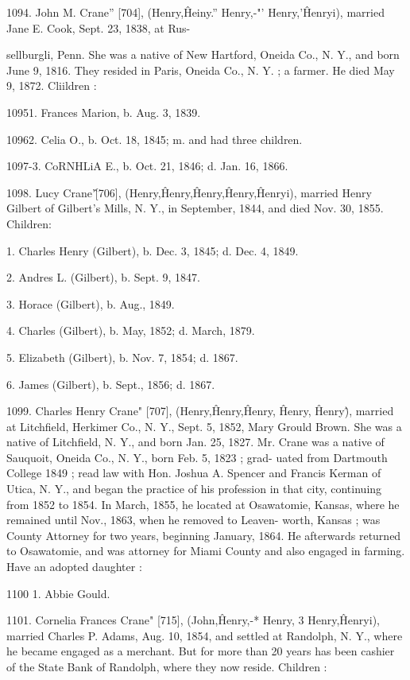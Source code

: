 1094. John M. Crane'' [704], (Henry,\^ Heiny.'' Henry,-"' 
Henry,'\^ Henryi), married Jane E. Cook, Sept. 23, 1838, at Rus- 




sellburgli, Penn. She was a native of New Hartford, Oneida 
Co., N. Y., and born June 9, 1816. They resided in Paris, 
Oneida Co., N. Y. ; a farmer. He died May 9, 1872. Cliildren : 

10951. Frances Marion, b. Aug. 3, 1839. 

10962. Celia O., b. Oct. 18, 1845; m. and had three children. 

1097-3. CoRNHLiA E., b. Oct. 21, 1846; d. Jan. 16, 1866. 

1098. Lucy Crane'\^ [706], (Henry,\^ Henry,\^ Henry,\^ Henry,\^ 
Henryi), married Henry Gilbert of Gilbert's Mills, N. Y., in 
September, 1844, and died Nov. 30, 1855. Children: 

1. Charles Henry (Gilbert), b. Dec. 3, 1845; d. Dec. 4, 1849. 

2. Andres L. (Gilbert), b. Sept. 9, 1847. 

3. Horace (Gilbert), b. Aug., 1849. 

4. Charles (Gilbert), b. May, 1852; d. March, 1879. 

5. Elizabeth (Gilbert), b. Nov. 7, 1854; d. 1867. 

6. James (Gilbert), b. Sept., 1856; d. 1867. 

1099. Charles Henry Crane" [707], (Henry,\^ Henry,\^ 
Henry, \^ Henry, \^ Henry\^), married at Litchfield, Herkimer Co., 
N. Y., Sept. 5, 1852, Mary Grould Brown. She was a native of 
Litchfield, N. Y., and born Jan. 25, 1827. Mr. Crane was a 
native of Sauquoit, Oneida Co., N. Y., born Feb. 5, 1823 ; grad- 
uated from Dartmouth College 1849 ; read law with Hon. Joshua 
A. Spencer and Francis Kerman of Utica, N. Y., and began the 
practice of his profession in that city, continuing from 1852 to 
1854. In March, 1855, he located at Osawatomie, Kansas, 
where he remained until Nov., 1863, when he removed to Leaven- 
worth, Kansas ; was County Attorney for two years, beginning 
January, 1864. He afterwards returned to Osawatomie, and was 
attorney for Miami County and also engaged in farming. Have 
an adopted daughter : 

1100  1. Abbie Gould. 

1101. Cornelia Frances Crane" [715], (John,\^ Henry,-* 
Henry, 3 Henry,\^ Henryi), married Charles P. Adams, Aug. 10, 
1854, and settled at Randolph, N. Y., where he became engaged 
as a merchant. But for more than 20 years has been cashier of 
the State Bank of Randolph, where they now reside. Children : 

